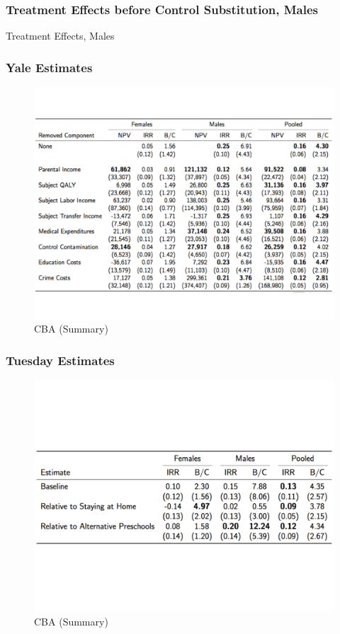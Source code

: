 \documentclass[static]{JJH-Beamer}
\begin{document}

\begin{frame}
\frametitle{Treatment Effects before Control Substitution, Males}
\begin{center}
\begin{table}
	\caption{Treatment Effects, Males} \label{tab:onsetsmales}
	\scalebox{.60}{}
\end{table}
\end{center}
\end{frame}


\begin{frame}
\frametitle{Yale Estimates}
\begin{figure}
\caption{CBA (Summary)}
	\includegraphics[width=.8\columnwidth]{output/yaleresults.pdf}
\end{figure}
\end{frame}


\begin{frame}
\frametitle{Tuesday Estimates}
\begin{figure}
\caption{CBA (Summary)}
	\includegraphics[width=.8\columnwidth]{output/pantanotuesdayestimates.pdf}
\end{figure}
\end{frame}
\end{document}
